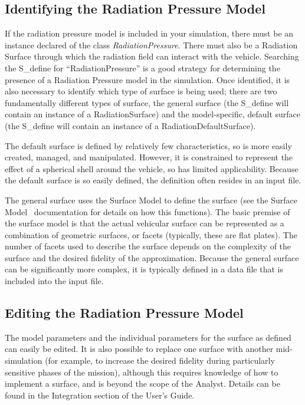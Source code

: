 %
%
%


\subsection{Identifying the Radiation Pressure Model}
If the radiation pressure model is included in your simulation, there must be an
instance declared of the class \textit{RadiationPressure}.  There must also be a
Radiation Surface through which the radiation field can interact with the
vehicle.  Searching the S\_define for ``RadiationPressure'' is a good strategy
for determining the presence of a Radiation Pressure model in the simulation.
Once identified, it is also necessary to identify which type of surface is being
used; there are two fundamentally different types of surface, the general
surface (the S\_define will contain an instance of a RadiationSurface) and the
model-specific, default surface (the S\_define will contain an instance of a RadiationDefaultSurface).

The default surface is defined by relatively few characteristics, so is more easily created, managed, and manipulated.  However, it is constrained to represent the effect of a spherical shell around the vehicle, so has limited applicability.  Because the default surface is so easily defined, the definition often resides in an input file.

The general surface uses the Surface Model to define the surface (see the Surface Model~\cite{dynenv:SURFACEMODEL} documentation for details on how this functions).  The basic premise of the surface model is that the actual vehicular surface can be represented as a combination of geometric surfaces, or facets (typically, these are flat plates).  The number of facets used to describe the surface depends on the complexity of the surface and the desired fidelity of the approximation.  Because the general surface can be significantly more complex, it is typically defined in a data file that is included into the input file.

\subsection{Editing the Radiation Pressure Model}
The model parameters and the individual parameters for the surface as defined can easily be edited.  It is also possible to replace one surface with another mid-simulation (for example, to increase the desired fidelity during particularly sensitive phases of the mission), although this requires knowledge of how to implement a surface, and is beyond the scope of the Analyst.  Details can be found in the Integration section of the User's Guide.

